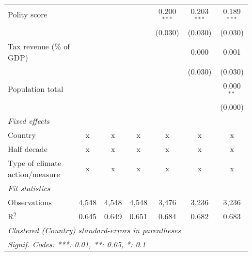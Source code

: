 \begin{tabular}{lcccccc}
   Polity score                                                           &         &                &                & 0.200$^{***}$  & 0.203$^{***}$  & 0.189$^{***}$\\   
                                                                          &         &                &                & (0.030)        & (0.030)        & (0.030)\\   
   Tax revenue (\% of GDP)                                                &         &                &                &                & 0.000          & 0.001\\   
                                                                          &         &                &                &                & (0.030)        & (0.030)\\   
   Population total                                                       &         &                &                &                &                & 0.000$^{**}$\\   
                                                                          &         &                &                &                &                & (0.000)\\   
   \emph{Fixed effects}\\
   Country                                                                & x       & x              & x              & x              & x              & x\\  
   Half decade                                                            & x       & x              & x              & x              & x              & x\\  
   Type of climate action/measure                                         & x       & x              & x              & x              & x              & x\\  
   \midrule \emph{Fit statistics}\\
   Observations                                                           & 4,548   & 4,548          & 4,548          & 3,476          & 3,236          & 3,236\\  
   R$^2$                                                                  & 0.645   & 0.649          & 0.651          & 0.684          & 0.682          & 0.683\\  
   \midrule
   \multicolumn{7}{l}{\emph{Clustered (Country) standard-errors in parentheses}}\\
   \multicolumn{7}{l}{\emph{Signif. Codes: ***: 0.01, **: 0.05, *: 0.1}}\\
\end{tabular}
\par\endgroup


